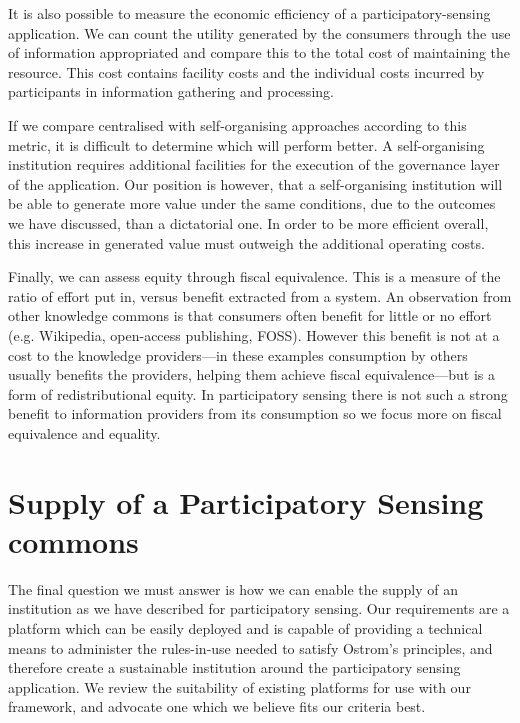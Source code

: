 It is also possible to measure the economic efficiency of a participatory-sensing application. We can count the utility generated by the consumers through the use of information appropriated and compare this to the total cost of maintaining the resource. This cost contains facility costs and the individual costs incurred by participants in information gathering and processing.

If we compare centralised with self-organising approaches according to this metric, it is difficult to determine which will perform better. 
A self-organising institution requires additional facilities for the execution of the governance layer of the application. 
Our position is however, that a self-organising institution will be able to generate more value under the same conditions, due to the outcomes we have discussed, than a dictatorial one. 
In order to be more efficient overall, this increase in generated value must outweigh the additional operating costs.

Finally, we can assess equity through fiscal equivalence. 
This is a measure of the ratio of effort put in, versus benefit extracted from a system. 
An observation from other knowledge commons is that consumers often benefit for little or no effort (e.g. Wikipedia, open-access publishing, FOSS). However this benefit is not at a cost to the knowledge providers---in these examples consumption by others usually benefits the providers, helping them achieve fiscal equivalence---but is a form of redistributional equity. In participatory sensing there is not such a strong benefit to information providers from its consumption so we focus more on fiscal equivalence and equality.

\section{Supply of a Participatory Sensing commons}

The final question we must answer is how we can enable the supply of an institution as we have described for participatory sensing. 
Our requirements are a platform which can be easily deployed and is capable of providing a technical means to administer the rules-in-use needed to satisfy Ostrom's principles, and therefore create a sustainable institution around the participatory sensing application. 
We review the suitability of existing platforms for use with our framework, and advocate one which we believe fits our criteria best.

